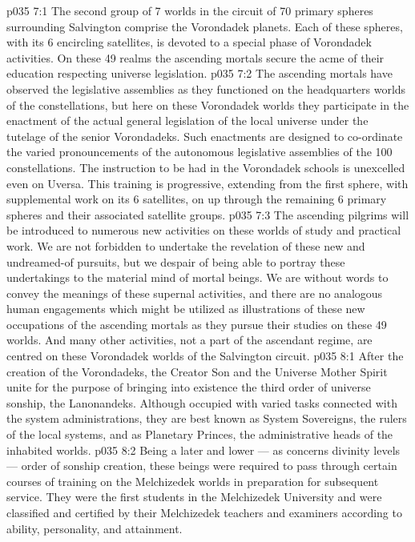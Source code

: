 \vs p035 7:1 The second group of 7 worlds in the circuit of 70 primary spheres surrounding Salvington comprise the Vorondadek planets. Each of these spheres, with its 6 encircling satellites, is devoted to a special phase of Vorondadek activities. On these 49 realms the ascending mortals secure the acme of their education respecting universe legislation.
\vs p035 7:2 The ascending mortals have observed the legislative assemblies as they functioned on the headquarters worlds of the constellations, but here on these Vorondadek worlds they participate in the enactment of the actual general legislation of the local universe under the tutelage of the senior Vorondadeks. Such enactments are designed to co\hyp{}ordinate the varied pronouncements of the autonomous legislative assemblies of the 100 constellations. The instruction to be had in the Vorondadek schools is unexcelled even on Uversa. This training is progressive, extending from the first sphere, with supplemental work on its 6 satellites, on up through the remaining 6 primary spheres and their associated satellite groups.
\vs p035 7:3 The ascending pilgrims will be introduced to numerous new activities on these worlds of study and practical work. We are not forbidden to undertake the revelation of these new and undreamed\hyp{}of pursuits, but we despair of being able to portray these undertakings to the material mind of mortal beings. We are without words to convey the meanings of these supernal activities, and there are no analogous human engagements which might be utilized as illustrations of these new occupations of the ascending mortals as they pursue their studies on these 49 worlds. And many other activities, not a part of the ascendant regime, are centred on these Vorondadek worlds of the Salvington circuit.
\vs p035 8:1 After the creation of the Vorondadeks, the Creator Son and the Universe Mother Spirit unite for the purpose of bringing into existence the third order of universe sonship, the Lanonandeks. Although occupied with varied tasks connected with the system administrations, they are best known as System Sovereigns, the rulers of the local systems, and as Planetary Princes, the administrative heads of the inhabited worlds.
\vs p035 8:2 Being a later and lower --- as concerns divinity levels --- order of sonship creation, these beings were required to pass through certain courses of training on the Melchizedek worlds in preparation for subsequent service. They were the first students in the Melchizedek University and were classified and certified by their Melchizedek teachers and examiners according to ability, personality, and attainment.
